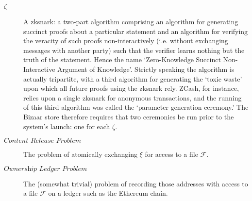 \documentclass[12pt,oneside]{amsart}
\makeatletter
\def\file{\mathcal{F}}
\def\ether{\xi}
\def\zksnark{\zeta}
\def\crp{\textit{Content Release Problem} }
\def\olp{\textit{Ownership Ledger Problem} }
\newcommand*\ie{i.e.\@\xspace}
\makeatother
\begin{document}
\begin{description}
\item[$\zksnark$] A zksnark: a two-part algorithm comprising an algorithm for generating succinct proofs about a particular statement and an algorithm for verifying the veracity of such proofs non-interactively (\ie without exchanging messages with another party) such that the verifier learns nothing but the truth of the statement.
Hence the name `Zero-Knowledge Succinct Non-Interactive Argument of Knowledge'.
Strictly speaking the algorithm is actually tripartite, with a third algorithm for generating the `toxic waste' upon which all future proofs using the zksnark rely.
ZCash, for instance, relies upon a single zksnark for anonymous transactions, and the running of this third algorithm was called the `parameter generation ceremony.'
The Bizaar store therefore requires that two ceremonies be run prior to the system's launch: one for each $\zksnark$.

\item[$\crp$] The problem of atomically exchanging $\ether$ for access to a file $\file$.

\item[$\olp$] The (somewhat trivial) problem of recording those addresses with access to a file $\file$ on a ledger such as the Ethereum chain.
\end{description}

\appendix
\end{document}
